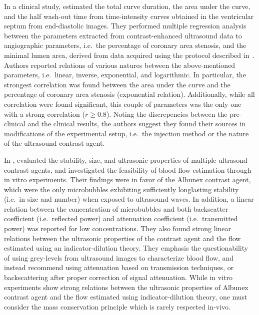 In a clinical study, \citet{TenCate:1987vw} estimated the total curve duration, the area under the curve, and the half wash-out time from time-intensity curves obtained in the ventricular septum from end-diastolic images.
They performed multiple regression analysis between the parameters extracted from contrast-enhanced ultrasound data to angiographic parameters, i.e.~the percentage of coronary area stenosis, and the minimal lumen area, derived from data acquired using the protocol described in~\cite{Wijns:1985wz}.
Authors reported relations of various natures between the above-mentioned parameters, i.e.~linear, inverse, exponential, and logarithmic.
In particular, the strongest correlation was found between the area under the curve and the percentage of coronary area stenosis (exponential relation). 
Additionally, while all correlation were found significant, this couple of parameters was the only one with a strong correlation ($r \geq 0.8$). 
Noting the discrepencies between the pre-clinical and the clinical results, the authors suggest they found their sources in modifications of the experimental setup, i.e.~the injection method or the nature of the ultrasound contrast agent.

In \citeyear{Bleeker:1990uy}, \citet{Bleeker:1990uy} evaluated the stability, size, and ultrasonic properties of multiple ultrasond contrast agents, and investigated the feasibility of blood flow estimation through in vitro experiments.
Their findings were in favor of the Albunex contrast agent, which were the only microbubbles exhibiting sufficiently longlasting stability (i.e.~in size and number) when exposed to ultrasound waves.
In addition, a linear relation between the concentration of microbubbles and both backscatter coefficient (i.e.~reflected power) and attenuation coefficient (i.e.~transmitted power) was reported for low concentrations.
They also found strong linear relations between the ultrasonic properties of the contrast agent and the flow estimated using an indicator-dilution theory.  
They emphasis the questionability of using grey-levels from ultrasound images to characterize blood flow, and instead recommend using attenuation based on transmission techniques, or backscattering after proper correction of signal attenuation.
While in vitro experiments show strong relations between the ultrasonic properties of Albunex contrast agent and the flow estimated using indicator-dilution theory, one must consider the mass conservation principle which is rarely respected in-vivo.

